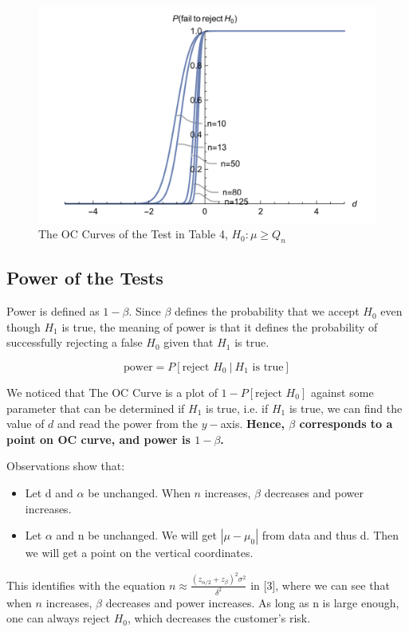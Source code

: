 \documentclass[a4paper]{article}
\begin{document}
\begin{figure}[!htbp] 
\centering 
\includegraphics[width=0.8\linewidth]{occurve3.png}  
\caption{The OC Curves of the Test in Table 4, $H_0: \mu\geq Q_n$} 
\label{fig1}
\end{figure}

\newpage

\subsection{Power of the Tests}
Power is defined as $1-\beta$. Since $\beta$ defines the probability that we accept $H_0$ even though $H_1$ is true, the meaning of power is that it defines the probability of successfully rejecting a false $H_0$ given that $H_1$ is true.

$$\text{power} = P[\text{reject }H_0\ |\ H_1 \text{ is true}]$$

We noticed that The OC Curve is a plot of $1 - P[\text{reject }H_0]$ against some parameter that can be determined if $H_1$ is true, i.e. if $H_1$ is true, we can find the value of $d$ and read the power from the $y-$axis. \textbf{Hence, $\beta$ corresponds to a point on OC curve, and power is $1-\beta$.}

Observations show that:
\begin{itemize}
    \item Let d and $\alpha$ be unchanged. When $n$ increases, $\beta$ decreases and power increases.
    \item Let $\alpha$ and n be unchanged. We will get $|\mu-\mu_0|$ from data and thus d. Then we will get a point on the vertical coordinates. 
\end{itemize}

This identifies with the equation $\displaystyle n \approx \frac{(z_{\alpha/2}+z_\beta)^2\sigma^2}{\delta^2}$ in [3], where we can see that when $n$ increases, $\beta$ decreases and power increases. As long as n is large enough, one can always reject $H_0$, which decreases the customer's risk.
\end{document}
